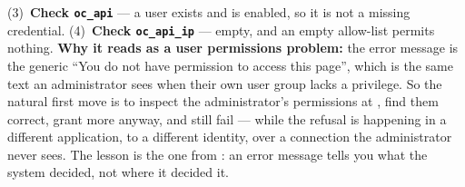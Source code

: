\begin{ans}
        (3)~\textbf{Check \texttt{oc\_api}} --- a user exists and is enabled, so
        it is not a missing credential. (4)~\textbf{Check
        \texttt{oc\_api\_ip}} --- empty, and an empty allow-list permits
        nothing. \textbf{Why it reads as a user permissions problem:} the error
        message is the generic ``You do not have permission to access this
        page'', which is the same text an administrator sees when their own
        user group lacks a privilege. So the natural first move is to inspect
        the administrator's permissions at , find them correct, grant more anyway, and still fail --- while
        the refusal is happening in a different application, to a different
        identity, over a connection the administrator never sees. The lesson is
        the one from : an error message tells you what the
        system decided, not where it decided it.
\end{ans}

